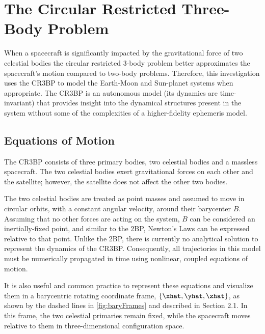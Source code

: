 \section{The Circular Restricted Three-Body Problem}
When a spacecraft is significantly impacted by the gravitational force of two celestial bodies the
circular restricted 3-body problem better approximates the spacecraft's motion compared to two-body
problems. Therefore, this investigation uses the CR3BP to model the Earth-Moon and Sun-planet
systems when appropriate. The CR3BP is an autonomous model (its dynamics are time-invariant) that
provides insight into the dynamical structures present in the system without some of the
complexities of a higher-fidelity ephemeris model.

\subsection{Equations of Motion}
The CR3BP consists of three primary bodies, two celestial bodies and a massless spacecraft. The two
celestial bodies exert gravitational forces on each other and the satellite; however, the satellite
does not affect the other two bodies. 

The two celestial bodies are treated as point masses and assumed to move in circular orbits, with a
constant angular velocity, around their barycenter $B$. Assuming that no other forces are acting on
the system, $B$ can be considered an inertially-fixed point, and similar to the 2BP, Newton's Laws
can be expressed relative to that point. Unlike the 2BP, there is currently no analytical solution
to represent the dynamics of the CR3BP. Consequently, all trajectories in this model must be
numerically propagated in time using nonlinear, coupled equations of motion.

It is also useful and common practice to represent these equations and visualize them in a
barycentric rotating coordinate frame, $\{\xhat,\yhat,\zhat\}$, as shown by the dashed lines in
\cref{fig:baryFrames} and described in Section 2.1. In this frame, the two celestial primaries
remain fixed, while the spacecraft moves relative to them in three-dimensional configuration space.

